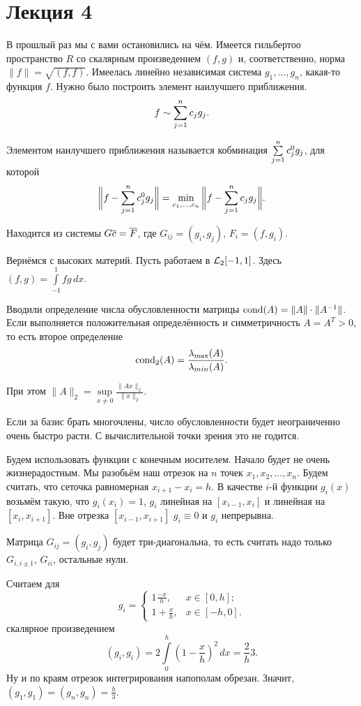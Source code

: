 \section{Лекция 4}
В прошлый раз мы с вами остановились на чём. Имеется гильбертоо пространство $R$ со скалярным произведением $(f,g)$ и, соответственно, норма $\|f\| = \sqrt{(f,f)}$. Имеелась линейно независимая система $g_1,\dots,g_n$, какая-то функция $f$. Нужно было построить элемент наилучшего приближения.
\[
  f\sim \sum\limits_{j = 1}^{n} c_j g_j.
\]
\begin{Def}
  Элементом наилучшего приближения называется кобминация $\sum\limits_{j = 1}^{n} c_j^0 g_j$, для которой
  \[
    \bigg\|f - \sum\limits_{j = 1}^{n} c_j^0 g_j\bigg\| = \min_{c_1,\dots,c_n} \bigg\|f - \sum\limits_{j = 1}^{n} c_j g_j\bigg\|.
  \]
\end{Def}
Находится из системы $G \overline{c} = \overline{F}$, где $G_{ij} = (g_i,g_j)$, $F_i = (f,g_i)$.

Вернёмся с высоких материй. Пусть работаем в $\mathcal L_2[-1,1]$. Здесь $(f,g) = \int\limits_{-1}^1 fg\,dx$.

Вводили определение числа обусловленности матрицы $\operatorname{cond}(A) = \|A\|\cdot \|A^{-1}\|$. Если выполняется положительная определённость и симметричность $A = A^T>0$, то есть второе определение
\[
  \operatorname{cond}_2(A) = \frac{\lambda_{\max}(A)}{\lambda_{min}(A)}.
\]

При этом $\|A\|_2 = \sup\limits_{x\ne 0} \frac{\|Ax\|_2}{\|x\|_2}$.

Если за базис брать многочлены, число обусловленности будет неограниченно очень быстро расти. С вычислительной точки зрения это не годится.

Будем использовать функции с конечным носителем. Начало будет не очень жизнерадостным. Мы разобьём наш отрезок на $n$ точек $x_1,x_2,\dots,x_n$. Будем считать, что сеточка равномерная $x_{i+1}-x_i = h$. В качестве $i$-й функции $g_i(x)$ возьмём такую, что $g_i(x_i) = 1$, $g_i$ линейная на $[x_{i-1},x_i]$ и линейная на $[x_{i}, x_{i+1}]$. Вне отрезка $[x_{i-1},x_{i+1}]$ $g_i\equiv 0$ и $g_i$ непрерывна.

Матрица $G_{ij} = (g_i,g_j)$ будет три-диагональна, то есть считать надо только $G_{i,i\pm1}$, $G_{ii}$, остальные нули.

Считаем для \[g_i = \begin{cases}
  1 \frac{-x}h,&x\in[0,h];\\
  1+\frac xh,&x\in[-h,0].
\end{cases}\]
скалярное произведением
\[
  (g_i,g_i) = 2\int\limits_0^h(1-\frac xh)^2\,dx = \frac2h3.
\]
Ну и по краям отрезок интегрирования напополам обрезан. Значит, $(g_1,g_1) = (g_n,g_n)=\frac h3$.

